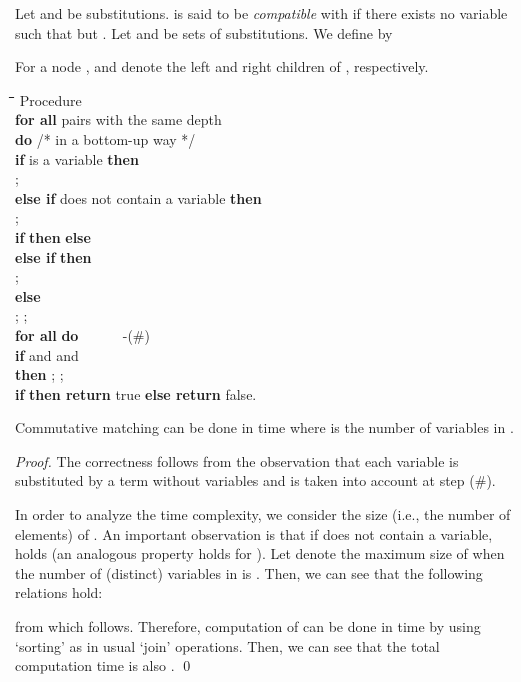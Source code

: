 \documentclass[a4paper]{llncs}
\begin{document}
Let  and
 be
substitutions.
 is said to be \emph{compatible} with
 if there exists no variable  such that
 but 
.
Let  and  be sets of substitutions.
We define  by

For a node ,  and  denote the left and right children of
, respectively.

\begin{rm}
\begin{tabbing}
\quad \= \quad \= \quad \= \quad \= \quad \= \quad \= \quad \= \kill
\> Procedure \\
\> \> {\bf for all} pairs  with the same depth\\
\> \> {\bf do} \hspace{6cm} /* in a bottom-up way */ \\
\> \> \> {\bf if}  is a variable {\bf then} \\
\> \> \> \> ;
 \\
\> \> \> {\bf else if}  does not contain a variable {\bf then}\\ 
\> \> \> \> ; \\
\> \> \> \> {\bf if}  {\bf then} 
{\bf else}  \\
\> \> \> {\bf else if}  {\bf then}\\
\> \> \> \> ;  \\
\> \> \> {\bf else} \\
\> \> \> \> ; ; \\
\> \> \> \> {\bf for all}  {\bf do} ~~~~~ -(\#)\\
\> \> \> \> \> {\bf if}  and  and
\\
\> \> \> \> \> {\bf then} ;
;\\
\> \> {\bf if}  {\bf then return} true {\bf else return} false.
\end{tabbing}
\end{rm}


\begin{theorem}
Commutative matching can be done in  time where
 is the number of variables in .
\end{theorem}
\begin{proof}
The correctness follows from the observation that
each variable is substituted by a term without variables and
 is taken into account at step (\#).

In order to analyze the time complexity,
we consider the size (i.e., the number of elements) 
of .
An important observation is that
if  does not
contain a variable,
 holds
(an analogous property holds for ).
Let  denote the maximum size of  when
the number of (distinct) variables in  is .
Then, we can see that the following relations hold:

from which  follows.
Therefore, computation of
 can be done in
 time by using `sorting' as in usual `join' operations.
Then, we can see that the total computation time is also
.
\qed
\end{proof}
\end{document}
